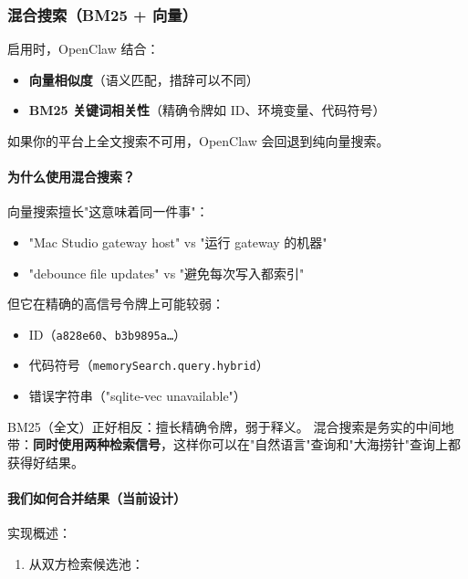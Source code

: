 \subsubsection{混合搜索（BM25 + 向量）}


启用时，OpenClaw 结合：

\begin{itemize}
  \item \textbf{向量相似度}（语义匹配，措辞可以不同）
  \item \textbf{BM25 关键词相关性}（精确令牌如 ID、环境变量、代码符号）
\end{itemize}


如果你的平台上全文搜索不可用，OpenClaw 会回退到纯向量搜索。

\paragraph{为什么使用混合搜索？}


向量搜索擅长"这意味着同一件事"：

\begin{itemize}
  \item "Mac Studio gateway host" vs "运行 gateway 的机器"
  \item "debounce file updates" vs "避免每次写入都索引"
\end{itemize}


但它在精确的高信号令牌上可能较弱：

\begin{itemize}
  \item ID（\texttt{a828e60}、\texttt{b3b9895a…}）
  \item 代码符号（\texttt{memorySearch.query.hybrid}）
  \item 错误字符串（"sqlite-vec unavailable"）
\end{itemize}


BM25（全文）正好相反：擅长精确令牌，弱于释义。
混合搜索是务实的中间地带：\textbf{同时使用两种检索信号}，这样你可以在"自然语言"查询和"大海捞针"查询上都获得好结果。

\paragraph{我们如何合并结果（当前设计）}


实现概述：

\begin{enumerate}
  \item 从双方检索候选池：
\end{enumerate}


